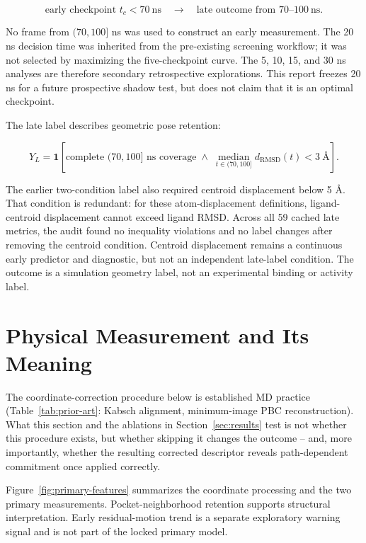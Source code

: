 \documentclass[11pt]{article}
\begin{document}
\[
\text{early checkpoint }t_c < 70\ \mathrm{ns}
\quad\longrightarrow\quad
\text{late outcome from }70\text{--}100\ \mathrm{ns}.
\]

No frame from $(70,100]$ ns was used to construct an early measurement. The 20 ns decision time was inherited from the pre-existing screening workflow; it was not selected by maximizing the five-checkpoint curve. The 5, 10, 15, and 30 ns analyses are therefore secondary retrospective explorations. This report freezes 20 ns for a future prospective shadow test, but does not claim that it is an optimal checkpoint.

The late label describes geometric pose retention:

\begin{equation}
Y_L = \mathbf{1}\!\left[
\text{complete }(70,100]\text{ ns coverage}
\;\land\;
\operatorname*{median}_{t\in(70,100]}d_{\mathrm{RMSD}}(t)<3\ \text{\AA}
\right].
\end{equation}

The earlier two-condition label also required centroid displacement below 5 \AA. That condition is redundant: for these atom-displacement definitions, ligand-centroid displacement cannot exceed ligand RMSD. Across all 59 cached late metrics, the audit found no inequality violations and no label changes after removing the centroid condition. Centroid displacement remains a continuous early predictor and diagnostic, but not an independent late-label condition. The outcome is a simulation geometry label, not an experimental binding or activity label.

\section{Physical Measurement and Its Meaning}
\label{sec:features}

The coordinate-correction procedure below is established MD practice (Table~\ref{tab:prior-art}: Kabsch alignment, minimum-image PBC reconstruction). What this section and the ablations in Section~\ref{sec:results} test is not whether this procedure exists, but whether skipping it changes the outcome -- and, more importantly, whether the resulting corrected descriptor reveals path-dependent commitment once applied correctly.

Figure~\ref{fig:primary-features} summarizes the coordinate processing and the two primary measurements. Pocket-neighborhood retention supports structural interpretation. Early residual-motion trend is a separate exploratory warning signal and is not part of the locked primary model.
\end{document}
